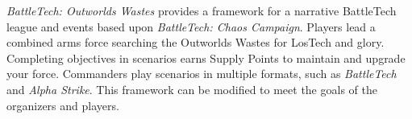 \emph{BattleTech: Outworlds Wastes} provides a framework for a narrative BattleTech league and events based upon \emph{BattleTech: Chaos Campaign}.
Players lead a combined arms force searching the Outworlds Wastes for LosTech and glory.
Completing objectives in scenarios earns Supply Points to maintain and upgrade your force.
Commanders play scenarios in multiple formats, such as \emph{BattleTech} and \emph{Alpha Strike}.
This framework can be modified to meet the goals of the organizers and players.
